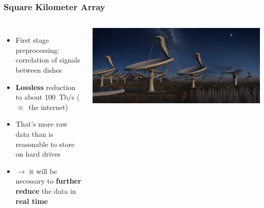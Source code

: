 \documentclass[10pt, compress]{beamer}
\begin{document}
\begin{frame}[fragile]
    \frametitle{Square Kilometer Array}
    \begin{columns}
            \begin{itemize}
                \item First stage preprocessing: correlation of signals between dishes
                \item \textbf{Lossless} reduction to about 100~Tb/s ($\approx$~the internet)
                \item That's more raw data than is reasonable to store on hard drives
                \item $\rightarrow$ it will be necessary to \textbf{further reduce} the data in \textbf{real time}
            \end{itemize}
            \vspace{.01cm}
            \includegraphics[height=\textheight]{assets/skaall_night.jpg}
    \end{columns}
\end{frame}
\end{document}
